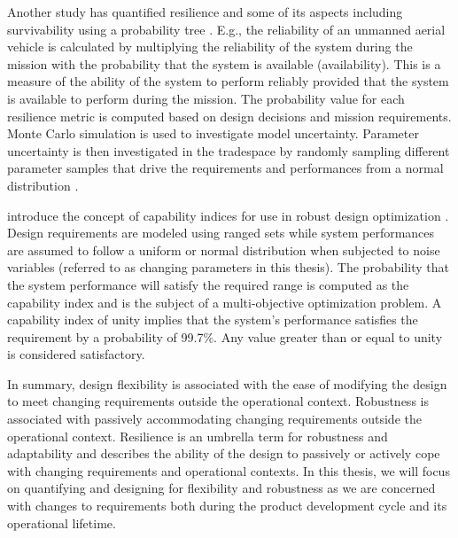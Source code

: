 Another study has quantified resilience and some of its aspects including survivability using a probability tree \cite{Small2019}. E.g., the reliability of an unmanned aerial vehicle is calculated by multiplying the reliability of the system during the mission with the probability that the system is available (availability). This is a measure of the ability of the system to perform reliably provided that the system is available to perform during the mission. The probability value for each resilience metric is computed based on design decisions and mission requirements. Monte Carlo simulation is used to investigate model uncertainty. Parameter uncertainty is then investigated in the tradespace by randomly sampling different parameter samples that drive the requirements and performances from a normal distribution \cite{Small2019}. 

\citeauthor{Chen1999} introduce the concept of capability indices for use in robust design optimization \cite{Chen1999}. Design requirements are modeled using ranged sets while system performances are assumed to follow a uniform or normal distribution when subjected to noise variables (referred to as changing parameters in this thesis). The probability that the system performance will satisfy the required range is computed as the capability index and is the subject of a multi-objective optimization problem. A capability index of unity implies that the system's performance satisfies the requirement by a probability of 99.7\%. Any value greater than or equal to unity is considered satisfactory.

In summary, design flexibility is associated with the ease of modifying the design to meet changing requirements outside the operational context. Robustness is associated with passively accommodating changing requirements outside the operational context. Resilience is an umbrella term for robustness and adaptability and describes the ability of the design to passively or actively cope with changing requirements and operational contexts. In this thesis, we will focus on quantifying and designing for flexibility and robustness as we are concerned with changes to requirements both during the product development cycle and its operational lifetime. 


